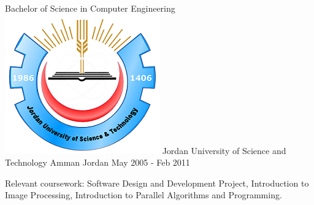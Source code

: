 \begin{cventries}
{    }
    \vspace{-2.5mm} \cventry
    {Bachelor of Science in Computer Engineering}
    {\includegraphics[scale=0.08]{img/Hi-Logo.png} Jordan University of Science and Technology}
    {Amman Jordan}
    {May 2005 - Feb 2011}
    {
      \begin{cvitems}     
        \item {Relevant coursework: Software Design and Development Project, Introduction to Image Processing, Introduction to Parallel Algorithms and Programming.}     
      \end{cvitems}
    }
\end{cventries}
